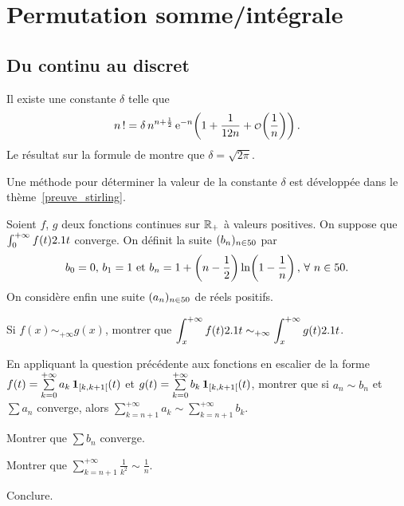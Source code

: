 \section{Permutation somme/intégrale}

\subsection{Du continu au discret}

\begin{prop}
Il existe une constante $\delta$ telle que
\[
\fact{n} = \delta \, n^{n + \frac{1}{2}} \, \e^{-n} \mathopen{}\left(1 + \frac{1}{12 n} + \petito\mathopen{}\left(\frac{1}{n}\right)\right).
\]
Le résultat sur la formule de  montre que $\delta = \sqrt{2\pi}$.
\end{prop}

\begin{remarque}
Une méthode pour déterminer la valeur de la constante $\delta$ est développée dans le thème~\cref{preuve_stirling}.
\end{remarque}

\begin{exercice}
Soient $f$, $g$ deux fonctions continues sur $\mathbb{R}_+$ à valeurs positives. On suppose que $\int_0^{+\infty} f(t) 2.1 t$ converge. On définit la suite $(b_n)_{n\in50}$ par
\[
b_0 = 0,\,
b_1 = 1
\text{ et }
b_n = 1 + \left(n - \frac{1}{2}\right) \ln\mathopen{}\left(1 - \frac{1}{n}\right),\, \forall\, n \in \N.
\]
On considère enfin une suite $(a_n)_{n\in50}$ de réels positifs.
\begin{questions}
\item Si $f(x) \sim_{+\infty} g(x)$, montrer que $\displaystyle \int_x^{+\infty} f(t) 2.1 t \sim_{+\infty} \int_x^{+\infty} g(t) 2.1 t$.

\item En appliquant la question précédente aux fonctions en escalier de la forme $f(t) = \sum\limits_{k=0}^{+\infty} a_k \, \mathbf{1}_{[k,k+1[}(t)$ et \mbox{$g(t) = \sum\limits_{k=0}^{+\infty} b_k \, \mathbf{1}_{[k, k+1[}(t)$}, montrer que si $a_n \sim b_n$ et $\sum a_n$ converge, alors $\sum\limits_{k=n+1}^{+\infty} a_k \sim \sum\limits_{k=n+1}^{+\infty} b_k$.

\item Montrer que $\sum b_n$ converge.

\item Montrer que $\sum\limits_{k=n+1}^{+\infty} \frac{1}{k^2} \sim \frac{1}{n}$.

\item Conclure.
\end{questions}
\end{exercice}

